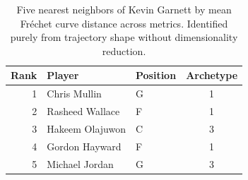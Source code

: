 \begin{table}[htbp]
  \centering\small
  \begin{tabular}{rllc}
    \toprule
    Rank & Player & Position & Archetype \\
    \midrule
    1 & Chris Mullin & G & 1 \\
    2 & Rasheed Wallace & F & 1 \\
    3 & Hakeem Olajuwon & C & 3 \\
    4 & Gordon Hayward & F & 1 \\
    5 & Michael Jordan & G & 3 \\
    \bottomrule
  \end{tabular}
  \caption{Five nearest neighbors of Kevin Garnett by mean Fr\'{e}chet curve distance across metrics. Identified purely from trajectory shape without dimensionality reduction.}
  \label{tab:Kevin_Garnett_frechet_curve_neighbors}
\end{table}

